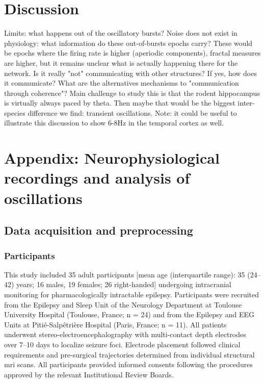 \documentclass[12pt,a4paper]{report}
\newcommand{\g}[1]{\gls{#1}}     %
\begin{document}
\chapter{Discussion}

Limits: what happens out of the oscillatory bursts? Noise does not exist in physiology: what information do these out-of-bursts epochs carry? These would be epochs where the firing rate is higher (aperiodic components), fractal measures are higher, but it remains unclear what is actually happening there for the network. Is it really "not" communicating with other structures? If yes, how does it communicate? What are the alternatives mechanisms to "communication through coherence"? Main challenge to study this is that the rodent hippocampus is virtually always paced by theta. Then maybe that would be the biggest inter-species difference we find: transient oscillations. Note: it could be useful to illustrate this discussion to show 6-8Hz in the temporal cortex as well.


\appendix

\chapter{Appendix: Neurophysiological recordings and analysis of oscillations}

\section{Data acquisition and preprocessing}
\label{apdx:acquisition}
\subsection{Participants}
This study included 35 adult participants [mean age (interquartile range): 35 (24–42) years; 16 males, 19 females; 26 right-handed] undergoing intracranial monitoring for pharmacologically intractable epilepsy. Participants were recruited from the Epilepsy and Sleep Unit of the Neurology Department at Toulouse University Hospital (Toulouse, France; n = 24) and from the Epilepsy and EEG Units at Pitié-Salpêtrière Hospital (Paris, France; n = 11). All patients underwent stereo-electroencephalography with multi-contact depth electrodes over 7–10 days to localize seizure foci. Electrode placement followed clinical requirements and pre-surgical trajectories determined from individual structural \g{mri} scans. All participants provided informed consents following the procedures approved by the relevant Institutional Review Boards.
\end{document}
